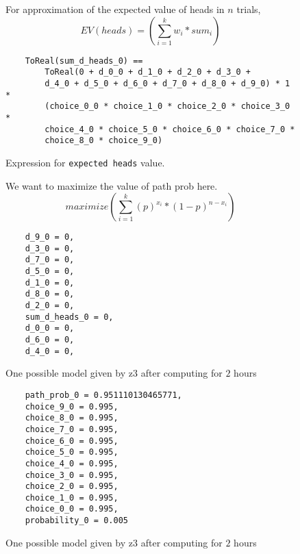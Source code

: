 \documentclass[usenames,dvipsnames,acmsmall]{acmart}
\begin{document}
\begin{figure}
	For approximation of the expected value of heads in $n$ trials,
	\begin{equation}	
		EV(heads) = (\sum_{i=1}^{k}{w_i * sum_i})
	\end{equation}
	\begin{verbatim}
	ToReal(sum_d_heads_0) ==
		ToReal(0 + d_0_0 + d_1_0 + d_2_0 + d_3_0 +
		d_4_0 + d_5_0 + d_6_0 + d_7_0 + d_8_0 + d_9_0) * 1 * 
		(choice_0_0 * choice_1_0 * choice_2_0 * choice_3_0 *
		choice_4_0 * choice_5_0 * choice_6_0 * choice_7_0 * 
		choice_8_0 * choice_9_0)
	\end{verbatim}
	\caption{Expression for \texttt{expected heads} value.}
\end{figure}

\begin{figure}
	We want to maximize the value of path prob here.
	\begin{equation}	
		maximize(\sum_{i=1}^{k}{(p)^{x_i} * (1-p)^{n-x_i}})
	\end{equation}
\end{figure}

\begin{figure}
	\begin{verbatim}
	d_9_0 = 0,
	d_3_0 = 0,
	d_7_0 = 0,
	d_5_0 = 0,
	d_1_0 = 0,
	d_8_0 = 0,
	d_2_0 = 0,
	sum_d_heads_0 = 0,
	d_0_0 = 0,
	d_6_0 = 0,
	d_4_0 = 0,
	\end{verbatim}
\caption{One possible model given by z3 after computing for $2$ hours}
\end{figure}
\begin{figure}
	\begin{verbatim}
	path_prob_0 = 0.951110130465771,
	choice_9_0 = 0.995,
	choice_8_0 = 0.995,
	choice_7_0 = 0.995,
	choice_6_0 = 0.995,
	choice_5_0 = 0.995,
	choice_4_0 = 0.995,
	choice_3_0 = 0.995,
	choice_2_0 = 0.995,
	choice_1_0 = 0.995,
	choice_0_0 = 0.995,
	probability_0 = 0.005
	\end{verbatim}
	\caption{One possible model given by z3 after computing for $2$ hours}
\end{figure}
\end{document}
